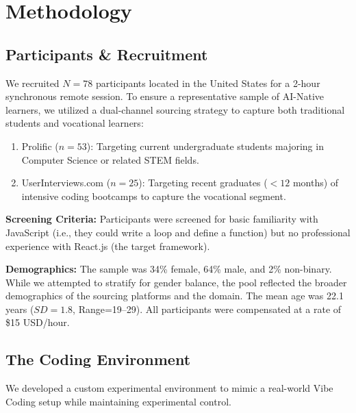 \documentclass[sigconf]{acmart}
\begin{document}
\section{Methodology}

\subsection{Participants \& Recruitment}
We recruited $N=78$ participants located in the United States for a 2-hour synchronous remote session. To ensure a representative sample of AI-Native learners, we utilized a dual-channel sourcing strategy to capture both traditional students and vocational learners:

\begin{enumerate}
    \item Prolific ($n=53$): Targeting current undergraduate students majoring in Computer Science or related STEM fields.
    \item UserInterviews.com ($n=25$): Targeting recent graduates ($<12$ months) of intensive coding bootcamps to capture the vocational segment.
\end{enumerate}

\textbf{Screening Criteria:} Participants were screened for basic familiarity with JavaScript (i.e., they could write a loop and define a function) but no professional experience with React.js (the target framework).

\textbf{Demographics:} The sample was 34\% female, 64\% male, and 2\% non-binary. While we attempted to stratify for gender balance, the pool reflected the broader demographics of the sourcing platforms and the domain. The mean age was 22.1 years ($SD=1.8$, Range=19--29). All participants were compensated at a rate of \$15 USD/hour.

\subsection{The Coding Environment}
We developed a custom experimental environment to mimic a real-world Vibe Coding setup while maintaining experimental control.
\end{document}
